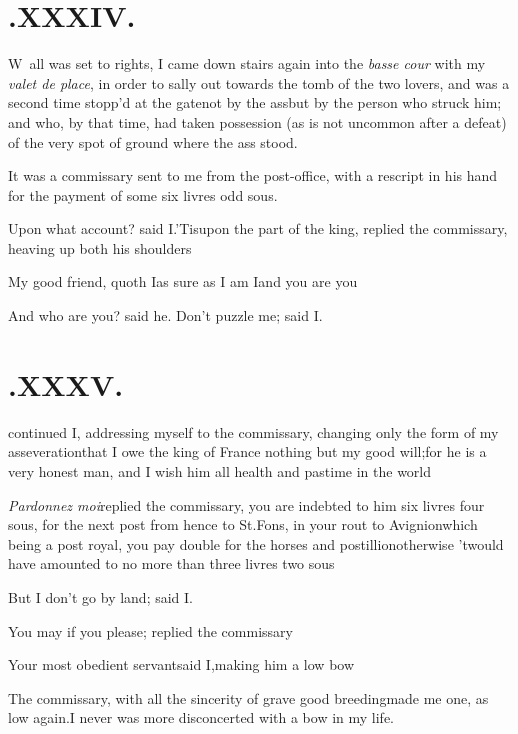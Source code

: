 \documentclass{article}
\begin{document}
\section{.\enspace XXXIV.}

\lettrine{W}{\,} all was set to rights, I came
down stairs again into the \textit{basse cour} with my \textit{valet de
place}, in order to sally out towards the tomb of the two
lovers, \etc\tsk and was a second time stopp’d at the
gate\tsh not by the ass\tsk but by the person who struck
him; and who, by that time, had taken possession (as is not
uncommon after a defeat) of the very spot of ground where the ass
stood.

It was a commissary sent to me from the post-office, with a
rescript in his hand for the payment of some six livres odd
sous.

Upon what account? said I.\tsh ’Tis\break upon the part
of the king, replied the commissary, heaving up both his
shoulders\tsh

\tsh My good friend, quoth I\tsh as sure as I
am I\tsk and you are you\tsh

\tsh And who are you? said he.\tsh\break
\tsh Don’t puzzle me; said I.

\section{.\enspace XXXV.}

\noindent
{}
continued I, addressing myself to the commissary, changing only
the form of my asseveration\tsh that I owe the king of France
nothing but my good will;\break for he is a very honest man, and
I wish him all health and pastime in the world\tsh

\textit{Pardonnez moi}\tsk replied the commissary, you are
indebted to him six livres
four sous, for the next post from hence to St.\@ Fons, in your
rout to Avignion\tsk which being a post royal, you pay double
for the horses and postillion\tsk otherwise ’twould have
amounted to no more than three livres two sous\tsh

\tsh But I don’t go by land; said I.

\tsh You may if you please; replied the commissary\tsh

Your most obedient servant\tsh said I,\break making him a low bow\tsh

The commissary, with all the sincerity of grave good breeding\tsk made me one, as low
again.\tsh I never was more disconcerted with a bow in my life.
\end{document}
